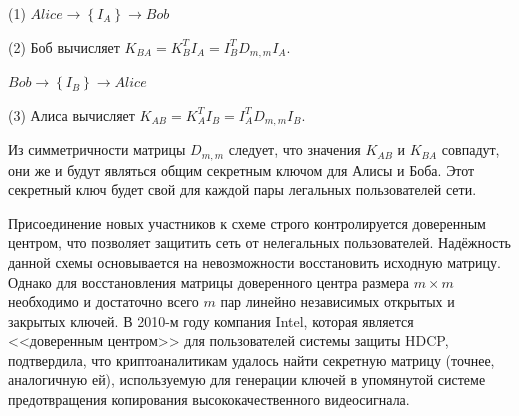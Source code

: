 \begin{protocol}
    \item[(1)] $Alice \to \left\{ I_A \right\} \to Bob$
    \item[(2)] Боб вычисляет $K_{BA} = K^T_B I_A = I^T_B D_{m,m} I_A$.
    \item[{}] $Bob \to \left\{ I_B \right\} \to Alice$
    \item[(3)] Алиса вычисляет $K_{AB} = K^T_A I_B = I^T_A D_{m,m} I_B$.
\end{protocol}

Из симметричности матрицы $D_{m,m}$ следует, что значения $K_{AB}$ и $K_{BA}$ совпадут, они же и будут являться общим секретным ключом для Алисы и Боба. Этот секретный ключ будет свой для каждой пары легальных пользователей сети.

Присоединение новых участников к схеме строго контролируется доверенным центром, что позволяет защитить сеть от нелегальных пользователей. Надёжность данной схемы основывается на невозможности восстановить исходную матрицу. Однако для восстановления матрицы доверенного центра размера $m \times m$ необходимо и достаточно всего $m$ пар линейно независимых открытых и закрытых ключей. В 2010-м году компания Intel, которая является <<доверенным центром>> для пользователей системы защиты HDCP, подтвердила, что криптоаналитикам удалось найти секретную матрицу (точнее, аналогичную ей), используемую для генерации ключей в упомянутой системе предотвращения копирования высококачественного видеосигнала.

